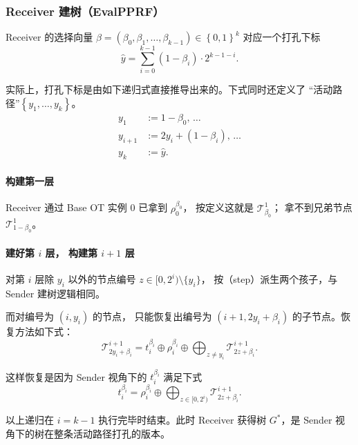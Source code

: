 \subsubsection{Receiver 建树（EvalPPRF）}

Receiver
的选择向量 $\beta = (\beta_0, \beta_1, \dots, \beta_{k-1}) \in \left\{0,1\right\}^k$ 对应一个打孔下标
\begin{equation}\label{eq:04-pprf:hole}
\hat y = \sum_{i=0}^{k-1} (1-\beta_i) \cdot 2^{k-1-i}. \tag{hole}
\end{equation}

实际上，打孔下标是由如下递归式直接推导出来的。下式同时还定义了
“活动路径”$\left\{y_1, \dots, y_k\right\}$。
\begin{align}y_1     &:= 1-\beta_0, \,\dots \\
y_{i+1} &:= 2y_i+(1-\beta_i), \,\dots \\
y_k &:= \hat y. \tag{path}
\end{align}

\paragraph{构建第一层}Receiver 通过 Base OT 实例 0 已拿到 $\rho_0^{\beta_0}$，
按定义这就是 $\mathcal{T}^1_{\beta_0}$；
拿不到兄弟节点 $\mathcal{T}^1_{1-\beta_0}$。

\paragraph{\texorpdfstring{建好第 $i$ 层，
构建第 $i+1$ 层}{建好第i层，构建第i+1层}}对第 $i$ 层除 $y_i$ 以外的节点编号 $z \in [0, 2^i) \setminus \{y_i\}$，
按（step）派生两个孩子，与 Sender 建树逻辑相同。

而对编号为 $(i, y_i)$ 的节点，
只能恢复出编号为 $(i+1, 2y_i+\beta_i)$ 的子节点。恢复方法如下式：
\begin{equation}\label{eq:04-pprf:8}
\mathcal{T}^{i+1}_{2 y_i + \beta_i} = 
t_i^{\beta_i} \oplus \rho_i^{\beta_i} 
\oplus \bigoplus_{z \neq y_i} \mathcal{T}^{i+1}_{2z + \beta_i}.
\end{equation}

这样恢复是因为 Sender 视角下的 $t_i^{\beta_i}$ 满足下式
\begin{equation}\label{eq:04-pprf:9}
t_i^{\beta_i} = \rho_i^{\beta_i} \oplus \bigoplus_{z \in [0, 2^i)} \mathcal{T}^{i+1}_{2z + \beta_i}.
\end{equation}

以上递归在 $i=k-1$ 执行完毕时结束。此时 Receiver 获得树 $G^*$，是
Sender 视角下的树在整条活动路径打孔的版本。

